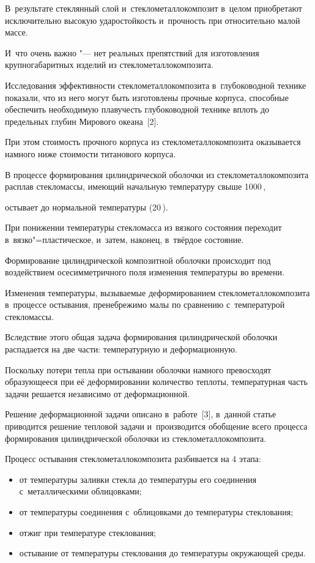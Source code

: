 В~результате стеклянный слой и~стеклометаллокомпозит в~целом приобретают исключительно высокую ударостойкость и~прочность при относительно малой массе. 

И~что очень важно "--- нет реальных препятствий для изготовления крупногабаритных изделий из стеклометаллокомпозита. 

Исследования эффективности стеклометаллокомпозита в~глубоководной технике показали, что из него могут быть изготовлены прочные корпуса, способные обеспечить  необходимую плавучесть глубоководной технике вплоть до предельных глубин Мирового океана~[2]. 

При этом стоимость прочного корпуса из стеклометаллокомпозита оказывается намного ниже стоимости титанового корпуса.



В процессе формирования цилиндрической оболочки из стеклометаллокомпозита расплав стекломассы, имеющий начальную температуру свыше 1000\,\textcelsius, 

остывает до нормальной температуры (20\,\textcelsius). 

При понижении температуры стекломасса из вязкого состояния переходит в~вязко"=пластическое, и~затем, наконец, в~твёрдое состояние. 

Формирование цилиндрической композитной оболочки происходит под воздействием осесимметричного поля изменения температуры во времени. 

Изменения температуры, вызываемые деформированием стеклометаллокомпозита в~процессе остывания, пренебрежимо малы по сравнению с~температурой стекломассы. 

Вследствие этого общая задача формирования цилиндрической оболочки распадается на две части: температурную и деформационную. 

Поскольку потери тепла при остывании оболочки намного превосходят образующееся при её деформировании количество теплоты, температурная часть задачи решается независимо от деформационной. 

Решение деформационной задачи описано в~работе~[3], в~данной статье приводится решение тепловой задачи и~производится обобщение всего процесса формирования цилиндрической оболочки из стеклометаллокомпозита.



Процесс остывания стеклометаллокомпозита разбивается на 4 этапа: 

\begin{itemize}

\item[--] от температуры заливки стекла до температуры его соединения с~металлическими облицовками; 

\item[--] от температуры соединения с~облицовками до температуры стеклования; 

\item[--] отжиг при температуре стеклования; 

\item[--] остывание от температуры стеклования до температуры окружающей среды.

\end{itemize}




